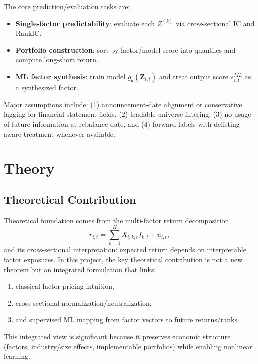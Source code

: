 \documentclass[letterpaper,11pt]{article}
\begin{document}
The core prediction/evaluation tasks are:
\begin{itemize}
    \item \textbf{Single-factor predictability}: evaluate each $Z^{(k)}$ via cross-sectional IC and RankIC.
    \item \textbf{Portfolio construction}: sort by factor/model score into quantiles and compute long-short return.
    \item \textbf{ML factor synthesis}: train model $g_\theta(\mathbf{Z}_{i,t})$ and treat output score $s^{ML}_{i,t}$ as a synthesized factor.
\end{itemize}

Major assumptions include: (1) announcement-date alignment or conservative lagging for financial statement fields, (2) tradable-universe filtering, (3) no usage of future information at rebalance date, and (4) forward labels with delisting-aware treatment whenever available.

\section{Theory}
\subsection{Theoretical Contribution}
Theoretical foundation comes from the multi-factor return decomposition
\begin{equation}
r_{i,t}=\sum_{k=1}^{K}X_{i,k,t}f_{k,t}+u_{i,t},
\end{equation}
and its cross-sectional interpretation: expected return depends on interpretable factor exposures. In this project, the key theoretical contribution is not a new theorem but an integrated formulation that links:
\begin{enumerate}
    \item classical factor pricing intuition,
    \item cross-sectional normalization/neutralization,
    \item and supervised ML mapping from factor vectors to future returns/ranks.
\end{enumerate}

This integrated view is significant because it preserves economic structure (factors, industry/size effects, implementable portfolios) while enabling nonlinear learning.
\end{document}
